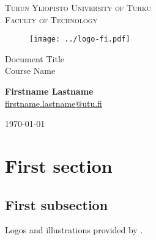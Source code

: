 \documentclass[12pt]{article}
\makeatletter
\newcommand{\faculty}{Faculty of Technology}
\newcommand{\course}{Course Name}
\newcommand{\documenttitle}{Document Title}
\newcommand{\authorname}{Firstname Lastname}
\newcommand{\authoremail}{firstname.lastname@utu.fi}
\newcommand{\documentdate}{\today}
\makeatother
\begin{document}
	\begin{titlepage}
		\begin{center}
			\textsc{Turun Yliopisto \textemdash \hspace{1mm} University of Turku} \\
			\textsc{\faculty}
		\end{center}
		\begin{figure}[h]
			\vspace{10mm}

			\centering\texttt{[image: ../logo-fi.pdf]}

			\vspace{20mm}
		\end{figure}
		\begin{center}
			\fontsize{10mm}{7mm}\selectfont
			\textup{\documenttitle} \\
			\textnormal{ \Large{\course}} \\

			\vspace{25mm}

			\large{\textbf{\authorname}} \\
			\large{\href{mailto:\authoremail}{\authoremail}} \\

			\vspace{35mm}

			\documentdate
		\end{center}
	\end{titlepage}

	\clearpage


	\tableofcontents

	\cleardoublepage


	\section{First section}

	\subsection{First subsection}

	Logos and illustrations provided by \citeauthor{UniversityOfTurku2022}.

	\clearpage


	\printbibliography[heading=bibintoc]
\end{document}
